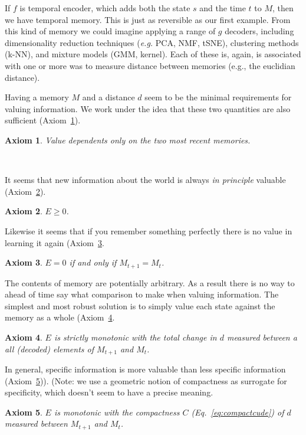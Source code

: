 \documentclass[9pt,twocolumn,twoside]{pnas-new}
\newtheorem{axiom}{Axiom}
\begin{document}
If $f$ is temporal encoder, which adds both the state $s$ and the time $t$ to $M$, then we have temporal memory. This is just as reversible as our first example. From this kind of memory we could imagine applying a range of $g$ decoders, including dimensionality reduction techniques (\textit{e.g.} PCA, NMF, tSNE), clustering methods (k-NN), and mixture models (GMM, kernel). Each of these is, again, is associated with one or more was to measure distance between memories (e.g., the euclidian distance).

Having a memory $M$ and a distance $d$ seem to be the minimal requirements for valuing information. We work under the idea that these two quantities are also  sufficient (Axiom~\ref{ax:1}).

\begin{axiom} 
    Value dependents only on the two most recent memories.
    \label{ax:1}
\end{axiom} \\
\noindent

It seems that new information about the world is always \textit{in principle} valuable (Axiom~\ref{ax:2}).
\begin{axiom}
    $E \geq 0$.
    \label{ax:2}
\end{axiom}
\noindent

Likewise it seems that if you remember something perfectly there is no value in learning it again (Axiom~\ref{ax:3}.
\begin{axiom}
    $E = 0$ if and only if $M_{t+1} = M_{t}$.
    \label{ax:3}
\end{axiom}
\noindent

The contents of memory are potentially arbitrary. As a result there is no way to ahead of time say what comparison to make when valuing information. The simplest and most robust solution is to simply value each state against the memory as a whole (Axiom~\ref{ax:4}. 
\begin{axiom}
    $E$ is strictly monotonic with the total change in $d$ measured between a all (decoded) elements of $M_{t+1}$ and $M_{t}$.
    \label{ax:4}
\end{axiom}
\noindent

In general, specific information is more valuable than less specific information (Axiom~\ref{ax:5})). (Note: we use a geometric notion of compactness as surrogate for specificity, which doesn't seem to have a precise meaning.
\begin{axiom}
    $E$ is monotonic with the compactness $C$ (Eq.~\ref{eq:compactcude}) of $d$ measured between $M_{t+1}$ and $M_{t}$.
    \label{ax:5}
\end{axiom}
\noindent
\end{document}
